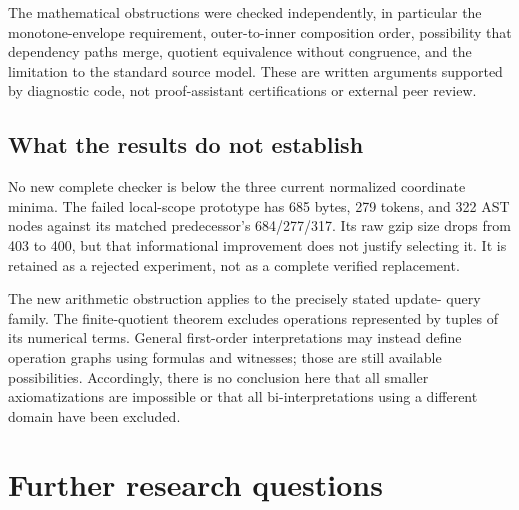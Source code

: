 \documentclass[11pt]{article}
\begin{document}
The mathematical obstructions were checked independently, in particular
the monotone-envelope requirement, outer-to-inner composition order,
possibility that dependency paths merge, quotient equivalence without
congruence, and the limitation to the standard source model. These are
written arguments supported by diagnostic code, not proof-assistant
certifications or external peer review.

\subsection{What the results do not establish}

No new complete checker is below the three current normalized coordinate
minima. The failed local-scope prototype has 685 bytes, 279 tokens, and
322 AST nodes against its matched predecessor's 684/277/317. Its raw
gzip size drops from 403 to 400, but that informational improvement does
not justify selecting it. It is retained as a rejected experiment, not
as a complete verified replacement.

The new arithmetic obstruction applies to the precisely stated update-
query family. The finite-quotient theorem excludes operations represented
by tuples of its numerical terms. General first-order interpretations
may instead define operation graphs using formulas and witnesses; those
are still available possibilities. Accordingly, there is no conclusion
here that all smaller axiomatizations are impossible or that all
bi-interpretations using a different domain have been excluded.

\section{Further research questions}
\end{document}
